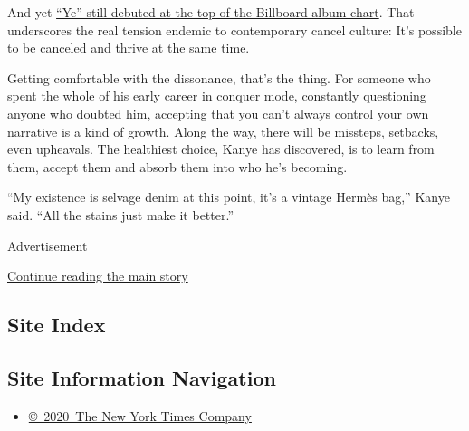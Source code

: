 And yet
\href{https://www.nytimes3xbfgragh.onion/2018/06/11/arts/music/kanye-west-ye-billboard-no-1-chart.html}{``Ye''
still debuted at the top of the Billboard album chart}. That underscores
the real tension endemic to contemporary cancel culture: It's possible
to be canceled and thrive at the same time.

Getting comfortable with the dissonance, that's the thing. For someone
who spent the whole of his early career in conquer mode, constantly
questioning anyone who doubted him, accepting that you can't always
control your own narrative is a kind of growth. Along the way, there
will be missteps, setbacks, even upheavals. The healthiest choice, Kanye
has discovered, is to learn from them, accept them and absorb them into
who he's becoming.

``My existence is selvage denim at this point, it's a vintage Hermès
bag,'' Kanye said. ``All the stains just make it better.''

Advertisement

\protect\hyperlink{after-bottom}{Continue reading the main story}

\hypertarget{site-index}{%
\subsection{Site Index}\label{site-index}}

\hypertarget{site-information-navigation}{%
\subsection{Site Information
Navigation}\label{site-information-navigation}}

\begin{itemize}
\tightlist
\item
  \href{https://help.nytimes3xbfgragh.onion/hc/en-us/articles/115014792127-Copyright-notice}{©~2020~The
  New York Times Company}
\end{itemize}

